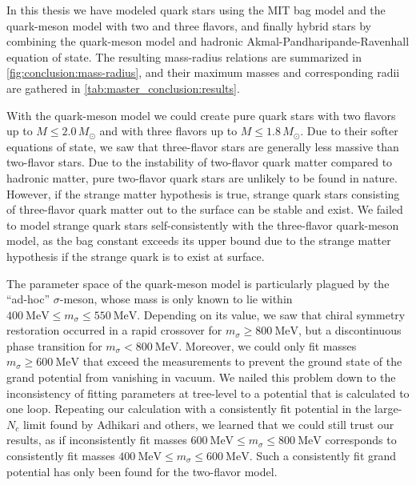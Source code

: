 In this thesis we have modeled quark stars using the MIT bag model and the quark-meson model with two and three flavors,
and finally hybrid stars by combining the quark-meson model and hadronic Akmal-Pandharipande-Ravenhall equation of state.
The resulting mass-radius relations are summarized in \cref{fig:conclusion:mass-radius},
and their maximum masses and corresponding radii are gathered in \cref{tab:master_conclusion:results}.

With the quark-meson model we could create pure quark stars with two flavors up to $M \leq 2.0 \, M_\odot$ and with three flavors up to $M \leq 1.8 \, M_\odot$.
Due to their softer equations of state, we saw that three-flavor stars are generally less massive than two-flavor stars.
Due to the instability of two-flavor quark matter compared to hadronic matter,
pure two-flavor quark stars are unlikely to be found in nature.
However, if the strange matter hypothesis is true,
strange quark stars consisting of three-flavor quark matter out to the surface can be stable and exist.
We failed to model strange quark stars self-consistently with the three-flavor quark-meson model,
as the bag constant exceeds its upper bound due to the strange matter hypothesis if the strange quark is to exist at surface.

The parameter space of the quark-meson model is particularly plagued by the ``ad-hoc'' $\sigma$-meson,
whose mass is only known to lie within $\SI{400}{\mega\electronvolt} \leq m_\sigma \leq \SI{550}{\mega\electronvolt}$.
Depending on its value, we saw that chiral symmetry restoration occurred in a rapid crossover for $m_\sigma \geq \SI{800}{\mega\electronvolt}$,
but a discontinuous phase transition for $m_\sigma < \SI{800}{\mega\electronvolt}$.
Moreover, we could only fit masses $m_\sigma \geq \SI{600}{\mega\electronvolt}$ that exceed the measurements
to prevent the ground state of the grand potential from vanishing in vacuum.
We nailed this problem down to the inconsistency of fitting parameters at tree-level to a potential that is calculated to one loop.
Repeating our calculation with a consistently fit potential in the large-$N_c$ limit found by Adhikari and others,
we learned that we could still trust our results,
as if inconsistently fit masses $\SI{600}{\mega\electronvolt} \leq m_\sigma \leq \SI{800}{\mega\electronvolt}$
corresponds to consistently fit masses $\SI{400}{\mega\electronvolt} \leq m_\sigma \leq \SI{600}{\mega\electronvolt}$.
Such a consistently fit grand potential has only been found for the two-flavor model.

